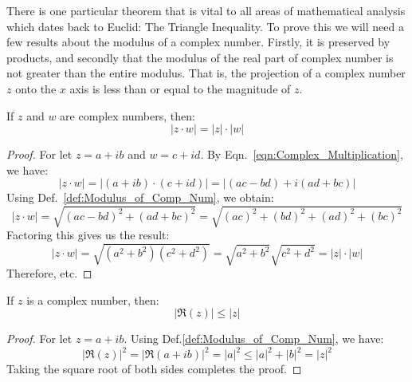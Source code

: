     There is one particular theorem that is vital to all areas of
    mathematical analysis which dates back to Euclid: The Triangle
    Inequality. To prove this we will need a few results about the
    modulus of a complex number. Firstly, it is preserved by products,
    and secondly that the modulus of the real part of complex number
    is not greater than the entire modulus. That is, the projection of
    a complex number $z$ onto the $x$ axis is less than or equal to the
    magnitude of $z$.
    \begin{theorem}
        \label{thm:Mod_Preserves_Products}%
        If $z$ and $w$ are complex numbers, then:
        \begin{equation}
            |z\cdot{w}|=|z|\cdot|w|
        \end{equation}
    \end{theorem}
    \begin{proof}
        For let $z=a+ib$ and $w=c+id$. By
        Eqn.~\ref{eqn:Complex_Multiplication}, we have:
        \begin{equation}
            |z\cdot{w}|=|(a+ib)\cdot(c+id)|
                       =|(ac-bd)+i(ad+bc)|
        \end{equation}
        Using Def.~\ref{def:Modulus_of_Comp_Num}, we obtain:
        \begin{equation}
            |z\cdot{w}|=\sqrt{(ac-bd)^{2}+(ad+bc)^{2}}
                       =\sqrt{(ac)^{2}+(bd)^{2}+(ad)^{2}+(bc)^{2}}
        \end{equation}
        Factoring this gives us the result:
        \begin{equation}
            |z\cdot{w}|=\sqrt{(a^{2}+b^{2})(c^{2}+d^{2})}
                       =\sqrt{a^{2}+b^{2}}\sqrt{c^{2}+d^{2}}
                       =|z|\cdot|w|
        \end{equation}
        Therefore, etc.
    \end{proof}
    \begin{theorem}
        \label{thm:Mod_of_Real_Part_LEQ_Mod}%
        If $z$ is a complex number, then:
        \begin{equation}
            |\Re(z)|\leq|z|
        \end{equation}
    \end{theorem}
    \begin{proof}
        For let $z=a+ib$. Using Def.\ref{def:Modulus_of_Comp_Num},
        we have:
        \begin{equation}
            |\Re(z)|^{2}=|\Re(a+ib)|^{2}
                        =|a|^{2}
                        \leq|a|^{2}+|b|^{2}
                        =|z|^{2}
        \end{equation}
        Taking the square root of both sides completes the proof.
    \end{proof}
